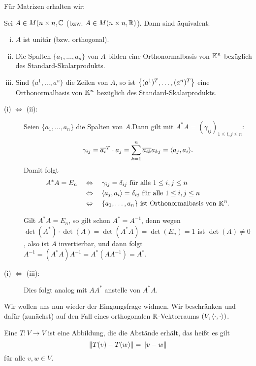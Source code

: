 Für Matrizen erhalten wir:

\begin{satz}
	\label{satz:6.9}
	Sei $A \in M(n \times n,\mathbb{C}$ (bzw. $A \in M(n \times n, \mathbb{R})$).
	Dann sind äquivalent:
	\begin{enumerate}[(i)]
		\item $A$ ist unitär (bzw. orthogonal).
		\item Die Spalten $\{a_1,\dots,a_n\}$ von $A$ bilden eine Orthonormalbasis von $\mathbb{K}^n$ bezüglich des Standard-Skalarprodukts.
		\item Sind $\{a^1,\dots,a^n\}$ die Zeilen von $A$, so ist $\left\{(a^1)^T,\dots,(a^n)^T\right\}$ eine Orthonormalbasis von $\mathbb{K}^n$ bezüglich des Standard-Skalarprodukts.
	\end{enumerate}
\end{satz}

\begin{beweis} 
	\begin{description}
		\item[(i) $\Leftrightarrow$ (ii):] Seien $\{a_1,\dots,a_n\}$ die Spalten von $A$.Dann gilt mit $A^*A = (\gamma_{ij})_{1 \leq i,j \leq n}$:
		\[
			\gamma_{ij} = \ol{a_i}^T \cdot a_j = \sum_{k=1}^{n} \ol{a_{ik}} a_{kj} = \sk{a_j,a_i}.
		\]
		Damit folgt
		\begin{align*}
			A^*A = E_n \quad &\Leftrightarrow \quad \gamma_{ij} = \delta_{ij} \text{ für alle } 1 \leq i,j \leq n \\
			&\Leftrightarrow \quad \left\langle a_j,a_i\right\rangle = \delta_{ij} \text{ für alle } 1 \leq i,j \leq n \\
			&\Leftrightarrow \quad \{a_1,\dots,a_n\} \text{ ist Orthonormalbasis von } \mathbb{K}^n.
		\end{align*}
		 
		Gilt $A^*A = E_n$, so gilt schon $A^* = A^{-1}$, denn wegen $\det(A^*) \cdot \det(A) = \det(A^*A) = \det(E_n) = 1$ ist $\det(A) \neq 0$, also ist $A$ invertierbar, und dann folgt $A^{-1} = (A^*A)A^{-1} = A^*(AA^{-1}) = A^*$.
		\item[(i) $\Leftrightarrow$ (iii):] Dies folgt analog mit $AA^*$ anstelle von $A^*A$. 
	\end{description}
\end{beweis}

Wir wollen uns nun wieder der Eingangsfrage widmen.
Wir beschränken und dafür (zunächst) auf den Fall eines orthogonalen $\mathbb{R}$-Vektorraums $(V,\left\langle\cdot,\cdot\right\rangle)$.

\begin{definition}
	\label{def:6.10}
	Eine  $T \colon V \rightarrow V$ ist eine Abbildung, die die Abstände erhält, das heißt es gilt
	\[
		\left\lVert T(v) - T(w)\right\rVert = \left\lVert v-w\right\rVert
	\]
	für alle $v,w \in V$.
\end{definition}

